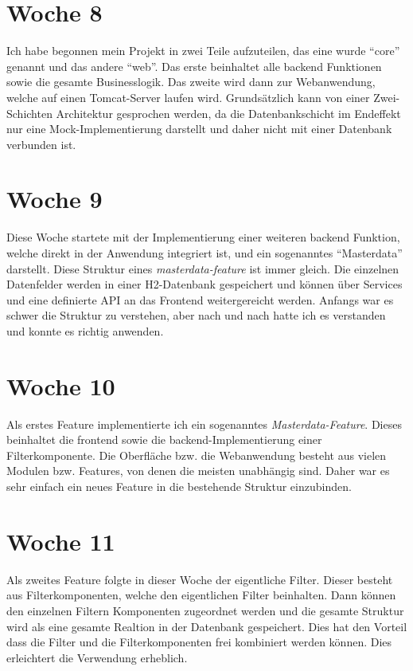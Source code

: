 \section{Woche 8}
Ich habe begonnen mein Projekt in zwei Teile aufzuteilen, das eine wurde "`core"' genannt und das andere "`web"'. Das erste beinhaltet alle backend Funktionen sowie die gesamte Businesslogik. Das zweite wird dann zur Webanwendung, welche auf einen Tomcat-Server laufen wird. Grundsätzlich kann von einer Zwei-Schichten Architektur gesprochen werden, da die Datenbankschicht im Endeffekt nur eine Mock-Implementierung darstellt und daher nicht mit einer Datenbank verbunden ist. 


\section{Woche 9}
Diese Woche startete mit der Implementierung  einer weiteren backend Funktion, welche direkt in der Anwendung integriert ist, und ein sogenanntes "`Masterdata"' darstellt. Diese Struktur eines \textit{masterdata-feature} ist immer gleich. Die einzelnen Datenfelder werden in einer H2-Datenbank gespeichert und können über Services und eine definierte API an das Frontend weitergereicht werden. Anfangs war es schwer die Struktur zu verstehen, aber nach und nach hatte ich es verstanden und konnte es richtig anwenden.

\section{Woche 10} 
Als erstes Feature implementierte ich ein sogenanntes \textit{Masterdata-Feature}. Dieses beinhaltet die frontend sowie die backend-Implementierung einer Filterkomponente. Die Oberfläche bzw. die Webanwendung besteht aus vielen Modulen bzw. Features, von denen die meisten unabhängig sind. Daher war es sehr einfach ein neues Feature in die bestehende Struktur einzubinden.

\section{Woche 11}
Als zweites Feature folgte in dieser Woche der eigentliche Filter. Dieser besteht aus Filterkomponenten, welche den eigentlichen Filter beinhalten. Dann können den  einzelnen Filtern Komponenten zugeordnet werden und die gesamte Struktur wird als eine gesamte Realtion in der Datenbank gespeichert. Dies hat den Vorteil dass die Filter und die Filterkomponenten frei kombiniert werden können. Dies erleichtert die Verwendung erheblich.


